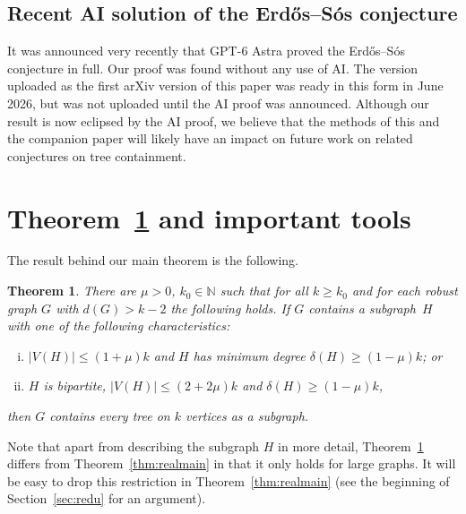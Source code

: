 \documentclass[12pt]{article}
\newtheorem{theorem}{Theorem}[section]
\begin{document}
\subsection{Recent AI solution of the Erd\H{o}s--S\'{o}s conjecture}
It was announced very recently that GPT-6 Astra proved the Erd\H{o}s--S\'{o}s conjecture in full. Our proof was found without any use of AI. The version uploaded as the first arXiv version of this paper was ready in this form  in June 2026, but was not uploaded until the AI proof was announced. 
Although our result is now eclipsed by the AI proof, we believe that   the methods of this and the companion paper will likely have an impact on future work on related conjectures on tree containment.

 
 
\section{Theorem~\ref{thm:main} and important tools} %
 The result behind our main theorem is the following.

 \begin{theorem}\label{thm:main}
 There are $\mu>0$, $k_0\in\mathbb N$ such that  for all $k\ge k_0$ and for each robust graph $G$  with $d(G)>k-2$ the following holds. If $G$   contains a subgraph~$H$ with one of the following characteristics:
     \begin{enumerate}[(i)]
     \item\label{cliquelikelem}
     $|V(H)|
    \le (1+\mu)k$  and 
    $H$ has minimum degree $\delta(H)\ge (1-\mu)k$; or
     \item\label{bicliquelikelem}
     $H$ is  bipartite,   $|V(H)|
    \le (2+2\mu)k$ and $\delta(H)\ge (1-\mu)k$,
       \end{enumerate}
         then $G$ contains every tree on $k$ vertices as a subgraph.
 \end{theorem}
 Note that apart from describing the subgraph $H$ in more detail, Theorem~\ref{thm:main} differs from  Theorem~\ref{thm:realmain} in that  it   only holds for large graphs.  It will be easy to drop this restriction in Theorem~\ref{thm:realmain} (see the beginning of Section~\ref{sec:redu} for an argument). 
\end{document}

